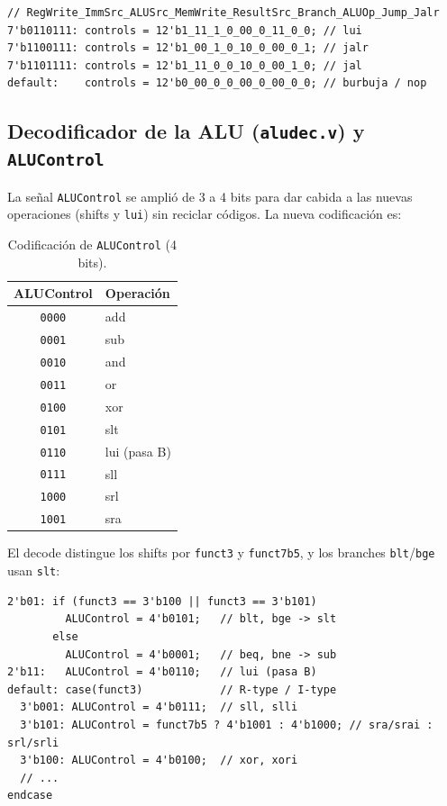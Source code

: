 \documentclass[11pt,a4paper]{article}
\begin{document}
\begin{lstlisting}
// RegWrite_ImmSrc_ALUSrc_MemWrite_ResultSrc_Branch_ALUOp_Jump_Jalr
7'b0110111: controls = 12'b1_11_1_0_00_0_11_0_0; // lui
7'b1100111: controls = 12'b1_00_1_0_10_0_00_0_1; // jalr
7'b1101111: controls = 12'b1_11_0_0_10_0_00_1_0; // jal
default:    controls = 12'b0_00_0_0_00_0_00_0_0; // burbuja / nop
\end{lstlisting}

\subsection{Decodificador de la ALU (\texttt{aludec.v}) y \texttt{ALUControl}}

La señal \texttt{ALUControl} se amplió de 3 a 4 bits para dar cabida a las nuevas
operaciones (shifts y \texttt{lui}) sin reciclar códigos. La nueva codificación es:

\begin{table}[ht]
	\centering
	\begin{tabular}{@{}cl@{}}
		\toprule
		\textbf{ALUControl} & \textbf{Operación} \\
		\midrule
		\texttt{0000}       & add                \\
		\texttt{0001}       & sub                \\
		\texttt{0010}       & and                \\
		\texttt{0011}       & or                 \\
		\texttt{0100}       & xor                \\
		\texttt{0101}       & slt                \\
		\texttt{0110}       & lui (pasa B)       \\
		\texttt{0111}       & sll                \\
		\texttt{1000}       & srl                \\
		\texttt{1001}       & sra                \\
		\bottomrule
	\end{tabular}
	\caption{Codificación de \texttt{ALUControl} (4 bits).}
\end{table}

El decode distingue los shifts por \texttt{funct3} y \texttt{funct7b5}, y los branches
\texttt{blt}/\texttt{bge} usan \texttt{slt}:

\begin{lstlisting}
2'b01: if (funct3 == 3'b100 || funct3 == 3'b101)
         ALUControl = 4'b0101;   // blt, bge -> slt
       else
         ALUControl = 4'b0001;   // beq, bne -> sub
2'b11:   ALUControl = 4'b0110;   // lui (pasa B)
default: case(funct3)            // R-type / I-type
  3'b001: ALUControl = 4'b0111;  // sll, slli
  3'b101: ALUControl = funct7b5 ? 4'b1001 : 4'b1000; // sra/srai : srl/srli
  3'b100: ALUControl = 4'b0100;  // xor, xori
  // ...
endcase
\end{lstlisting}
\end{document}
